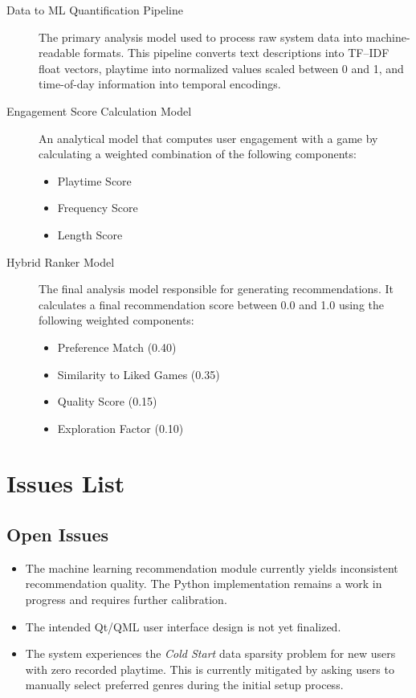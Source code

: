 \begin{description}

\item[Data to ML Quantification Pipeline]
The primary analysis model used to process raw system data into machine-readable formats. 
This pipeline converts text descriptions into TF--IDF float vectors, playtime into normalized
values scaled between 0 and 1, and time-of-day information into temporal encodings.

\item[Engagement Score Calculation Model]
An analytical model that computes user engagement with a game by calculating a weighted
combination of the following components:

\begin{itemize}
\item Playtime Score
\item Frequency Score
\item Length Score
\end{itemize}

\item[Hybrid Ranker Model]
The final analysis model responsible for generating recommendations. It calculates a final
recommendation score between 0.0 and 1.0 using the following weighted components:

\begin{itemize}
\item Preference Match (0.40)
\item Similarity to Liked Games (0.35)
\item Quality Score (0.15)
\item Exploration Factor (0.10)
\end{itemize}

\end{description}

\section{Issues List}

\subsection*{Open Issues}

\begin{itemize}

\item The machine learning recommendation module currently yields inconsistent recommendation
quality. The Python implementation remains a work in progress and requires further calibration.

\item The intended Qt/QML user interface design is not yet finalized.

\item The system experiences the \textit{Cold Start} data sparsity problem for new users with zero
recorded playtime. This is currently mitigated by asking users to manually select preferred
genres during the initial setup process.

\end{itemize}

